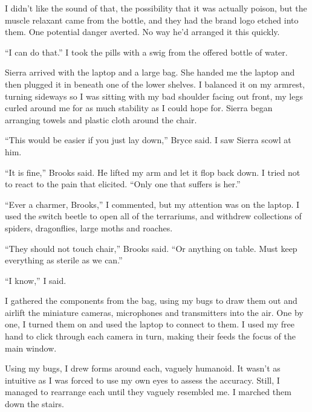I didn't like the sound of that, the possibility that it was actually poison, but the muscle relaxant came from the bottle, and they had the brand logo etched into them.  One potential danger averted.  No way he'd arranged it this quickly.



``I can do that.''  I took the pills with a swig from the offered bottle of water.



Sierra arrived with the laptop and a large bag.  She handed me the laptop and then plugged it in beneath one of the lower shelves.  I balanced it on my armrest, turning sideways so I was sitting with my bad shoulder facing out front, my legs curled around me for as much stability as I could hope for.  Sierra began arranging towels and plastic cloth around the chair.



``This would be easier if you just lay down,'' Bryce said.  I saw Sierra scowl at him.



``It is fine,'' Brooks said.  He lifted my arm and let it flop back down.  I tried not to react to the pain that elicited.  ``Only one that suffers is her.''



``Ever a charmer, Brooks,'' I commented, but my attention was on the laptop.  I used the switch beetle to open all of the terrariums, and withdrew collections of spiders, dragonflies, large moths and roaches.



``They should not touch chair,'' Brooks said.  ``Or anything on table.  Must keep everything as sterile as we can.''



``I know,'' I said.



I gathered the components from the bag, using my bugs to draw them out and airlift the miniature cameras, microphones and transmitters into the air.  One by one, I turned them on and used the laptop to connect to them.  I used my free hand to click through each camera in turn, making their feeds the focus of the main window.



Using my bugs, I drew forms around each, vaguely humanoid.  It wasn't as intuitive as I was forced to use my own eyes to assess the accuracy.  Still, I managed to rearrange each until they vaguely resembled me.  I marched them down the stairs.



